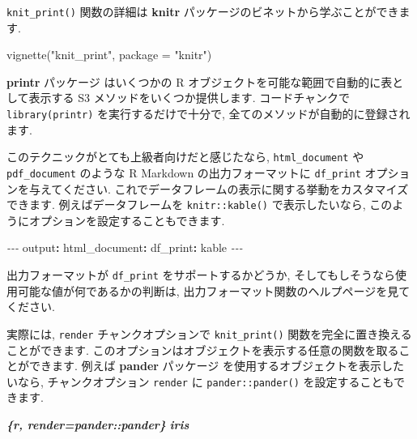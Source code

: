 \documentclass[
  11pt,
]{bxjsreport}
\newenvironment{Shaded}{\begin{snugshade}}{\end{snugshade}}
\newcommand{\AttributeTok}[1]{\textcolor[rgb]{0.77,0.63,0.00}{#1}}
\newcommand{\FunctionTok}[1]{\textcolor[rgb]{0.00,0.00,0.00}{#1}}
\newcommand{\InformationTok}[1]{\textcolor[rgb]{0.56,0.35,0.01}{\textbf{\textit{#1}}}}
\newcommand{\KeywordTok}[1]{\textcolor[rgb]{0.13,0.29,0.53}{\textbf{#1}}}
\newcommand{\NormalTok}[1]{#1}
\newcommand{\PreprocessorTok}[1]{\textcolor[rgb]{0.56,0.35,0.01}{\textit{#1}}}
\newcommand{\StringTok}[1]{\textcolor[rgb]{0.31,0.60,0.02}{#1}}
\begin{document}
\texttt{knit\_print()} 関数の詳細は \textbf{knitr} パッケージのビネットから学ぶことができます.

\begin{Shaded}
\begin{Highlighting}[numbers=left,,]
\FunctionTok{vignette}\NormalTok{(}\StringTok{"knit\_print"}\NormalTok{, }\AttributeTok{package =} \StringTok{"knitr"}\NormalTok{)}
\end{Highlighting}
\end{Shaded}

\textbf{printr} パッケージ \autocite{R-printr} はいくつかの R オブジェクトを可能な範囲で自動的に表として表示する S3 メソッドをいくつか提供します. コードチャンクで \texttt{library(printr)} を実行するだけで十分で, 全てのメソッドが自動的に登録されます.

このテクニックがとても上級者向けだと感じたなら, \texttt{html\_document} や \texttt{pdf\_document} のような R Markdown の出力フォーマットに \texttt{df\_print} オプションを与えてください. これでデータフレームの表示に関する挙動をカスタマイズできます. 例えばデータフレームを \texttt{knitr::kable()} で表示したいなら, このようにオプションを設定することもできます.

\begin{Shaded}
\begin{Highlighting}[]
\PreprocessorTok{{-}{-}{-}}
\FunctionTok{output}\KeywordTok{:}
\AttributeTok{  }\FunctionTok{html\_document}\KeywordTok{:}
\AttributeTok{    }\FunctionTok{df\_print}\KeywordTok{:}\AttributeTok{ kable}
\PreprocessorTok{{-}{-}{-}}
\end{Highlighting}
\end{Shaded}

出力フォーマットが \texttt{df\_print} をサポートするかどうか, そしてもしそうなら使用可能な値が何であるかの判断は, 出力フォーマット関数のヘルプページを見てください.

実際には, \texttt{render} チャンクオプションで \texttt{knit\_print()} 関数を完全に置き換えることができます. このオプションはオブジェクトを表示する任意の関数を取ることができます. 例えば \textbf{pander} パッケージ を使用するオブジェクトを表示したいなら, チャンクオプション \texttt{render} に \texttt{pander::pander()} を設定することもできます.

\begin{Shaded}
\begin{Highlighting}[]
\InformationTok{\textasciigrave{}\textasciigrave{}\textasciigrave{}\{r, render=pander::pander\}}
\InformationTok{iris}
\InformationTok{\textasciigrave{}\textasciigrave{}\textasciigrave{}}
\end{Highlighting}
\end{Shaded}
\end{document}
